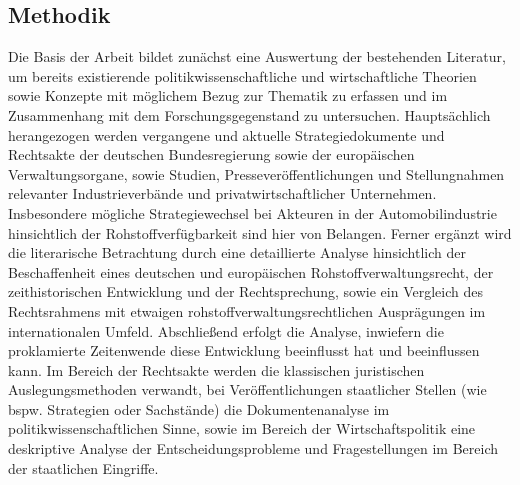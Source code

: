 \documentclass[12pt,a4paper,oneside]{book} %
\begin{document}
\subsection{Methodik}
Die Basis der Arbeit bildet zunächst eine Auswertung der bestehenden Literatur, um bereits existierende politikwissenschaftliche und wirtschaftliche Theorien sowie Konzepte mit möglichem Bezug zur Thematik zu erfassen und im Zusammenhang mit dem Forschungsgegenstand zu untersuchen. Hauptsächlich herangezogen werden vergangene und aktuelle Strategiedokumente und Rechtsakte der deutschen Bundesregierung sowie der europäischen Verwaltungsorgane, sowie Studien, Presseveröffentlichungen und Stellungnahmen relevanter Industrieverbände und privatwirtschaftlicher Unternehmen. Insbesondere mögliche Strategiewechsel bei Akteuren in der Automobilindustrie hinsichtlich der Rohstoffverfügbarkeit sind hier von Belangen. Ferner ergänzt wird die literarische Betrachtung durch eine detaillierte Analyse hinsichtlich der Beschaffenheit eines deutschen und europäischen Rohstoffverwaltungsrecht, der zeithistorischen Entwicklung und der Rechtsprechung, sowie ein Vergleich des Rechtsrahmens mit etwaigen rohstoffverwaltungsrechtlichen Ausprägungen im internationalen Umfeld. Abschließend erfolgt die Analyse, inwiefern die proklamierte Zeitenwende diese Entwicklung beeinflusst hat und beeinflussen kann. Im Bereich der Rechtsakte werden die klassischen juristischen Auslegungsmethoden verwandt, bei Veröffentlichungen staatlicher Stellen (wie bspw. Strategien oder Sachstände) die Dokumentenanalyse im politikwissenschaftlichen Sinne,\autocite[203]{reh_quellen-_1995} sowie im Bereich der Wirtschaftspolitik eine deskriptive Analyse der Entscheidungsprobleme und Fragestellungen im Bereich der staatlichen Eingriffe.\autocite[6f.]{schmidt_theorie_2019}
\end{document}

